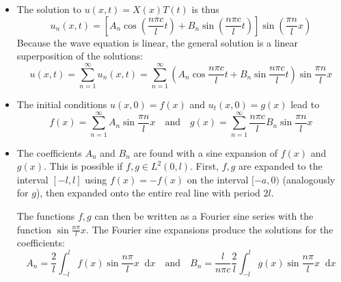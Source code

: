 \documentclass[11pt, a4paper]{article}
\newcommand{\diff}{\mathop{}\!\mathrm{d}} %
\begin{document}
\begin{itemize}
  	\item The solution to $ u(x, t) = X(x)T(t) $ is thus
  	\begin{equation*}
  		u_{n}(x, t) = \left[A_n \cos(\frac{n\pi c}{l} t ) + B_n \sin( \frac{n\pi c}{l} t)\right] \sin (\frac{\pi n}{l} x)
  	\end{equation*}
  	Because the wave equation is linear, the general solution is a linear superposition of the solutions:
  	\begin{equation*}
  		u(x, t) = \sum_{n=1}^{\infty} u_{n}(x, t) = \sum_{n=1}^{\infty}\left(A_n \cos \frac{n\pi c}{l} t  + B_n \sin \frac{n\pi c}{l} t\right)\sin\frac{\pi n}{l} x
  	\end{equation*}
  
  	\item The initial conditions $ u(x, 0) = f(x) $ and $ u_{t}(x, 0) = g(x) $ lead to
  	\begin{equation*}
  		f(x) = \sum_{n=1}^{\infty} A_n \sin\frac{\pi n}{l} x \quad \text{and} \quad g(x) = \sum_{n=1}^{\infty} \frac{n\pi c}{l} B_n  \sin\frac{\pi n}{l} x
  	\end{equation*}
  	
  	\item The coefficients $ A_{n} $ and $ B_{n} $ are found with a sine expansion of $ f(x) $ and $ g(x) $. This is possible if $ f, g \in L^{2}(0, l) $. First, $ f, g $ are expanded to the interval $ [-l, l] $ using $ f(x) = -f(x)$ on the interval $ [-a, 0) $ (analogously for $ g $), then expanded onto the entire real line with period $ 2l $. 
  	
  	The functions $ f, g $ can then be written as a Fourier sine series with the function $ \sin \frac{n \pi}{l}x $. The Fourier sine expansions produce the solutions for the coefficients:
  	\begin{equation*}
  		A_{n} = \frac{2}{l}\int_{-l}^{l}f(x) \sin \frac{n \pi}{l}x \diff x \quad \text{and} \quad B_n = \frac{l}{n\pi c} \frac{2}{l}\int_{-l}^{l}g(x) \sin \frac{n \pi}{l}x \diff x
  	\end{equation*}
\end{itemize}
\end{document}
